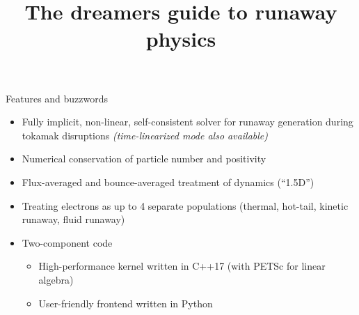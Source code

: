 \documentclass[titleunderline,widescreen1610]{chalmerspresentation}
\title{The dreamers guide to runaway physics}
\begin{document}
    {
        \begin{frame}
            \titlepage
        \end{frame}
    }

    \begin{frame}{Features and buzzwords}
        \begin{itemize}
            \item Fully implicit, non-linear, self-consistent solver for runaway generation during tokamak disruptions \emph{(time-linearized mode also available)}
            \item Numerical conservation of particle number and positivity
            \item Flux-averaged and bounce-averaged treatment of dynamics (``1.5D'')
            \item Treating electrons as up to 4 separate populations (thermal, hot-tail, kinetic runaway, fluid runaway)
            \item Two-component code
            \begin{itemize}
                \item High-performance kernel written in C++17 (with PETSc for linear algebra)
                \item User-friendly frontend written in Python
            \end{itemize}
        \end{itemize}
    \end{frame}
\end{document}
